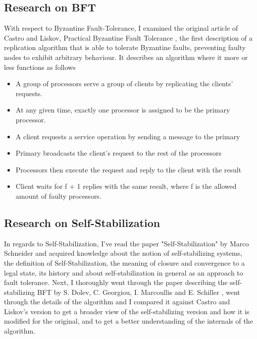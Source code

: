 \documentclass[12pt,a4paper]{report}
\begin{document}
			
			\subsection{Research on BFT}
				With respect to Byzantine Fault-Tolerance, I examined the original article of Castro and Liskov, Practical Byzantine Fault Tolerance
				\cite{pbft}, the first description of a replication algorithm that is able to tolerate Byzantine faults, preventing faulty nodes to exhibit
				arbitrary behaviour. It describes an algorithm where it more or less functions as follows
				\begin{itemize}
				    \item A group of processors serve a group of clients by replicating the clients' requests.
				    \item At any given time, exactly one processor is assigned to be the primary processor.
					\item A client requests a service operation by sending a message to the primary
					\item Primary broadcasts the client's request to the rest of the processors
					\item Processors then execute the request and reply to the client with the result
					\item Client waits for f + 1 replies with the same result, where f is the allowed amount of faulty processors.
				\end{itemize}
				

			
			\subsection{Research on Self-Stabilization}
			In regards to Self-Stabilization, I've read the paper "Self-Stabilization" by Marco Schneider\cite{ss} and acquired knowledge about the notion of
			self-stabilizing systems, the definition of Self-Stabilization, the meaning of closure and convergence to a legal state, its history and about
			self-stabilization in general as an approach to fault tolerance. Next, I thoroughly went through the paper describing the self-stabilizing BFT by S. Dolev, C. Georgiou, I. Marcoullis and E. Schiller \cite{ssbft}, went through the details of
			the	algorithm and I compared it	against Castro and Liskov's version to get a broader view of the self-stabilizing version and how it is modified
			for the original, and to get a better understanding of the internals of the algorithm.
\end{document}
